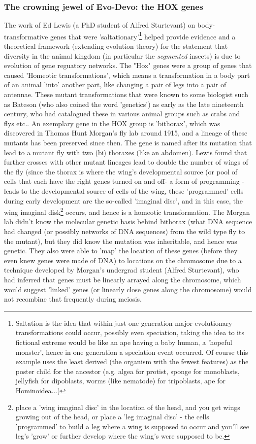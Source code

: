 \subsubsection{The crowning jewel of Evo-Devo: the HOX genes}
The work of Ed Lewis (a PhD student of Alfred Sturtevant) on body-transformative genes that were 'saltationary'\footnote{Saltation is the idea that within just one generation major evolutionary transformations could occur, possibly even speciation, taking the idea to its fictional extreme would be like an ape having a baby human, a 'hopeful monster', hence in one generation a speciation event occurred.  Of course this example uses the least derived (the organism with the fewest features) as the poster child for the ancestor (e.g. algea for protist, sponge for monoblasts, jellyfish for dipoblasts, worms (like nematode) for tripoblasts, ape for Hominoidea...)} helped provide evidence and a theoretical framework (extending evolution theory) for the statement that diversity in the animal kingdom (in particular the \textit{segmented} insects) is due to evolution of gene reguatory networks.  The "Hox" genes were a group of genes that caused 'Homeotic transformations', which means a transformation in a body part of an animal 'into' another part, like changing a pair of legs into a pair of antennae.  These mutant transformations that were known to some biologist such as Bateson (who also coined the word 'genetics') as early as the late nineteenth century, who had catalogued these in various animal groups such as crabs and flys etc..  An exemplary gene in the HOX group is 'bithorax', which was discovered in Thomas Hunt Morgan's fly lab around 1915, and a lineage of these mutants has been preserved since then. The gene is named after its mutation that lead to a mutant fly with two (bi) thoraxes (like an abdomen).  Lewis found that further crosses with other mutant lineages lead to double the number of wings of the fly (since the thorax is where the wing's developmental source (or pool of cells that each have the right genes turned on and off- a form of programming - leads to the developmental source of cells of the wing, these 'programmed' cells during early development are the so-called 'imaginal disc', and in this case, the wing imaginal disk\footnote{place a 'wing imaginal disc' in the location of the head, and you get wings growing out of the head, or place a 'leg imaginal disc' - the cells 'programmed' to build a leg where a wing is supposed to occur and you'll see leg's 'grow' or further develop where the wing's were supposed to be.} occurs, and hence is a homeotic transformation.  The Morgan lab didn't know the molecular genetic basis behind bithorax (what DNA sequence had changed (or possibly networks of DNA sequences) from the wild type fly to the mutant), but they did know the mutation was inheritable, and hence was genetic.  They also were able to 'map' the location of these genes (before they even knew genes were made of DNA) to locations on the chromosome due to a technique developed by Morgan's undergrad student (Alfred Sturtevant), who had inferred that genes must be linearly arrayed along the chromosome, which would suggest 'linked' genes (or linearly close genes along the chromosome) would not recombine that frequently during meiosis\cite{sturtevant}.  

